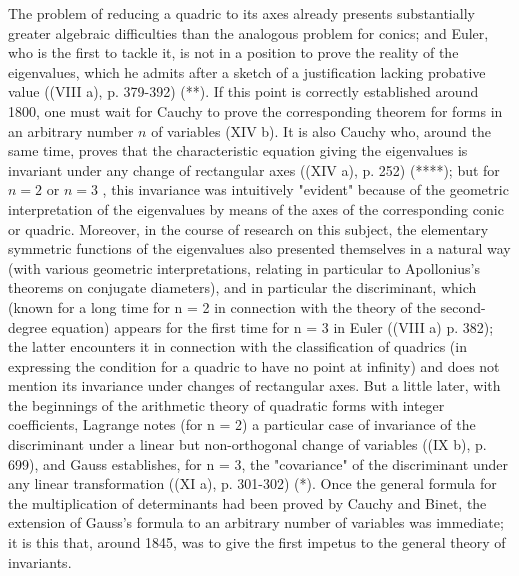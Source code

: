The problem of reducing a quadric to its axes already presents substantially greater algebraic difficulties than the analogous problem for conics; and Euler, who is the first to tackle it, is not in a position to prove the reality of the eigenvalues, which he admits after a sketch of a justification lacking probative value ((VIII a), p. 379-392) (**). If this point is correctly established around 1800, one must wait for Cauchy to prove the corresponding theorem for forms in an arbitrary number \(n\) of variables (XIV b). It is also Cauchy who, around the same time, proves that the characteristic equation giving the eigenvalues is invariant under any change of rectangular axes ((XIV a), p. 252) (****); but for \(n = 2\) or \(n = 3\) , this invariance was intuitively "evident" because of the geometric interpretation of the eigenvalues by means of the axes of the corresponding conic or quadric. Moreover, in the course of research on this subject, the elementary symmetric functions of the eigenvalues also presented themselves in a natural way (with various geometric interpretations, relating in particular to Apollonius's theorems on conjugate diameters), and in particular the discriminant, which (known for a long time for n = 2 in connection with the theory of the second-degree equation) appears for the first time for n = 3 in Euler ((VIII a) p. 382); the latter encounters it in connection with the classification of quadrics (in expressing the condition for a quadric to have no point at infinity) and does not mention its invariance under changes of rectangular axes. But a little later, with the beginnings of the arithmetic theory of quadratic forms with integer coefficients, Lagrange notes (for n = 2) a particular case of invariance of the discriminant under a linear but non-orthogonal change of variables ((IX b), p. 699), and Gauss establishes, for n = 3, the "covariance" of the discriminant under any linear transformation ((XI a), p. 301-302) (*). Once the general formula for the multiplication of determinants had been proved by Cauchy and Binet, the extension of Gauss's formula to an arbitrary number of variables was immediate; it is this that, around 1845, was to give the first impetus to the general theory of invariants.

